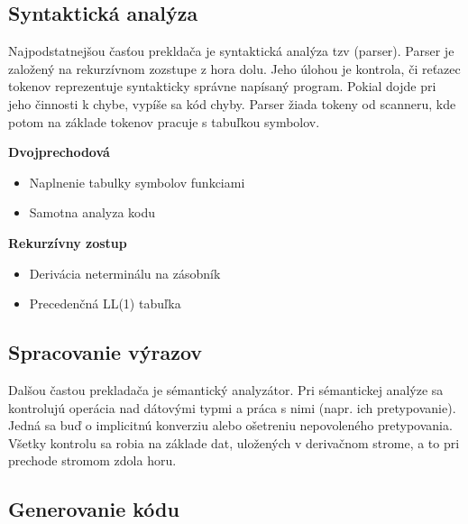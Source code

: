 \documentclass[a4paper, 11pt]{article}
\begin{document}
        
    \pagebreak    
        
    \subsection{Syntaktická analýza}
    
    Najpodstatnejšou časťou prekldača je syntaktická analýza tzv (parser). Parser je založený na rekurzívnom zozstupe z hora dolu. Jeho úlohou je kontrola, či reťazec tokenov reprezentuje syntakticky správne napísaný program. Pokial dojde pri jeho činnosti k chybe, vypíše sa kód chyby. Parser žiada tokeny od scanneru, kde potom na základe tokenov pracuje s tabuľkou symbolov.

    \vspace{4mm}
    
    \textbf{\large{Dvojprechodová}}
    \begin{itemize} 
        \item Naplnenie tabulky symbolov funkciami
        \item Samotna analyza kodu
    \end{itemize}    
        
    \textbf{\large{Rekurzívny zostup}}
    \begin{itemize}
        \item Derivácia neterminálu na zásobník
        \item Precedenčná LL(1) tabuľka
    \end{itemize}
    
        
    \subsection{Spracovanie výrazov}
    
    Dalšou častou prekladača je sémantický analyzátor. Pri sémantickej analýze sa kontrolujú operácia nad dátovými typmi a práca s nimi (napr. ich pretypovanie). Jedná sa buď o implicitnú konverziu alebo ošetreniu nepovoleného pretypovania. Všetky kontrolu sa robia na základe dat, uložených v derivačnom strome, a to pri prechode stromom zdola horu.
        
    \subsection{Generovanie kódu}
    
\end{document}
